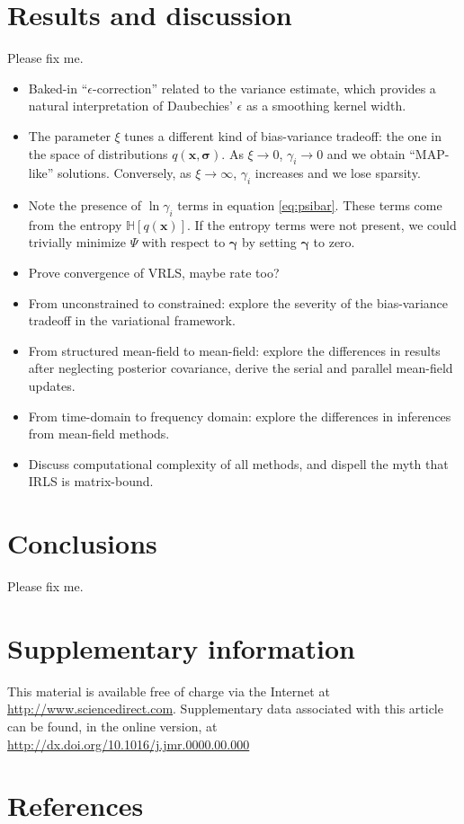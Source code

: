 \documentclass[final,5p,times,twocolumn]{elsarticle}
\newcommand{\m}[1]{\boldsymbol{#1}}
\newcommand{\entropy}[1]{\mathbb{H}\left[ #1 \right]}
\begin{document}
\section{Results and discussion}
\label{s:results}
Please fix me.

\begin{itemize}
 \item Baked-in ``$\epsilon$-correction'' related to the variance
  estimate, which provides a natural interpretation of Daubechies'
  $\epsilon$ as a smoothing kernel width.
 \item The parameter $\xi$ tunes a different kind of bias-variance
  tradeoff: the one in the space of distributions $q(\m{x}, \m{\sigma})$.
  As $\xi \to 0$, $\gamma_i \to 0$ and we obtain ``MAP-like'' solutions.
  Conversely, as $\xi \to \infty$, $\gamma_i$ increases and we lose
  sparsity.
 \item Note the presence of $\ln \gamma_i$ terms in equation
  \eqref{eq:psibar}.
These terms come from the entropy $\entropy{q(\m{x})}$. If the entropy
terms were not present, we could trivially minimize $\Psi$ with respect
to $\m{\gamma}$ by setting $\m{\gamma}$ to zero.
 \item Prove convergence of VRLS, maybe rate too?
 \item From unconstrained to constrained: explore the severity of
  the bias-variance tradeoff in the variational framework.
 \item From structured mean-field to mean-field: explore the
  differences in results after neglecting posterior covariance,
  derive the serial and parallel mean-field updates.
 \item From time-domain to frequency domain: explore the differences
  in inferences from mean-field methods.
 \item Discuss computational complexity of all methods, and
  dispell the myth that IRLS is matrix-bound.
\end{itemize}

\section{Conclusions}
\label{s:concl}
Please fix me.

\appendix
\section{Supplementary information}
\label{a:si}
This material is available free of charge via the Internet at
\url{http://www.sciencedirect.com}. Supplementary data associated
with this article can be found, in the online version, at
\url{http://dx.doi.org/10.1016/j.jmr.0000.00.000}

\section*{References}
 

\end{document}
